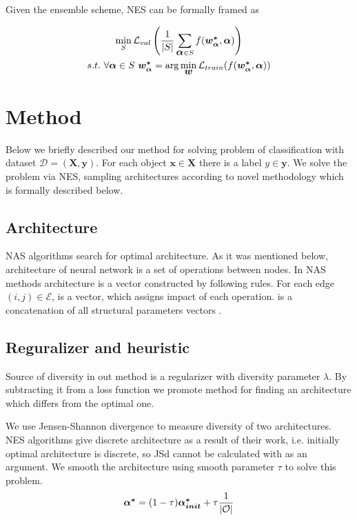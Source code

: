 \documentclass{article}
\begin{document}
Given the ensemble scheme, NES can be formally framed as

\begin{gather*}
	\min_S \mathcal{L}_{val}\left(\frac{1}{|S|}\sum_{\mbox{\boldmath{$\alpha$}} \in S}f(\mbox{\boldmath{$w_\alpha^*$}}, \mbox{\boldmath{$\alpha$}})\right) \\
s.t. \text{ }\forall \mbox{\boldmath{$\alpha$}} \in S \text{ } \mbox{\boldmath{$w_\alpha^*$}} = \arg \min_{\mbox{\boldmath{$w$}}} \mathcal{L}_{train}(f(\mbox{\boldmath{$w_\alpha^*$}}, \mbox{\boldmath{$\alpha$}}))
\end{gather*}

\section{Method}

Below we briefly described our method for solving problem of classification with dataset $\mathcal{D} = (\mathbf{X}, \mathbf{y})$. For each object $\mathbf{x} \in \mathbf{X}$ there is a label $y \in \mathbf{y}$. We solve the problem via NES, sampling architectures according to novel methodology which is formally described below.

\subsection{Architecture}

NAS algorithms search for optimal architecture. 
As it was mentioned below, architecture of neural network is a set of operations between nodes. In NAS methods architecture is a vector constructed by following rules. For each edge $(i, j) \in \mathcal{E}$, \mbox{} is a vector, which assigns impact of each operation.
\mbox{\boldmath{$\alpha$}} is a concatenation of all structural parameters vectors \mbox{}.

\subsection{Reguralizer and heuristic}

Source of diversity in out method is a regularizer with diversity parameter $\lambda$. By subtracting it from a loss function we promote method for finding an architecture which differs from the optimal one.

We use Jensen-Shannon divergence to measure diversity of two architectures. NES algorithms give discrete architecture as a result of their work, i.e. initially optimal architecture \mbox{} is discrete, so JSd cannot be calculated with \mbox{} as an argument. We smooth the architecture using smooth parameter $\tau$ to solve this problem. 
$$
\mbox{\boldmath{$\alpha^*$}} = (1 - \tau)\mbox{\boldmath{$\alpha_{init}^*$}} + \tau \frac{1}{|\mathcal{O}|}
$$
\end{document}
